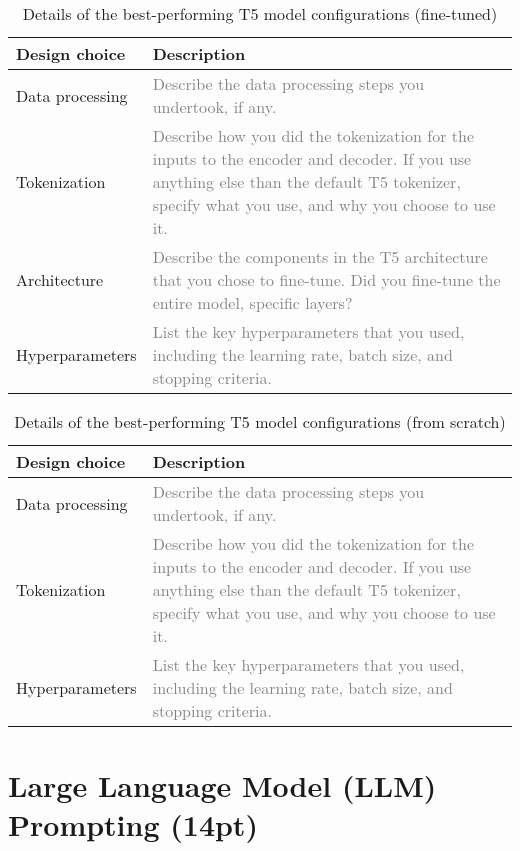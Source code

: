 \documentclass{article}
\begin{document}
\begin{table}[h!]
\centering
\begin{tabular}{p{3.5cm}p{10cm}}
\toprule
Design choice & Description \\
\midrule
Data processing & \textcolor{gray}{Describe the data processing steps you undertook, if any.} \\
Tokenization & \textcolor{gray}{Describe how you did the tokenization for the inputs to the encoder and decoder. If you use anything else than the default T5 tokenizer, specify what you use, and why you choose to use it.} \\
Architecture & \textcolor{gray}{Describe the components in the T5 architecture that you chose to fine-tune. Did you fine-tune the entire model, specific layers?} \\
Hyperparameters & \textcolor{gray}{List the key hyperparameters that you used, including the learning rate, batch size, and stopping criteria.} \\
\bottomrule
\end{tabular}
\caption{Details of the best-performing T5 model configurations (fine-tuned)}
\label{tab:t5_results_ft}
\end{table}


\begin{table}[h!]
\centering
\begin{tabular}{p{3.5cm}p{10cm}}
\toprule
Design choice & Description \\
\midrule
Data processing & \textcolor{gray}{Describe the data processing steps you undertook, if any.} \\
Tokenization & \textcolor{gray}{Describe how you did the tokenization for the inputs to the encoder and decoder. If you use anything else than the default T5 tokenizer, specify what you use, and why you choose to use it.} \\
Hyperparameters & \textcolor{gray}{List the key hyperparameters that you used, including the learning rate, batch size, and stopping criteria.} \\
\bottomrule
\end{tabular}
\caption{Details of the best-performing T5 model configurations (from scratch)}
\label{tab:t5_results_scratch}
\end{table}


\newpage



\section{Large Language Model (LLM) Prompting (14pt)}\label{sec:llm}
\end{document}
